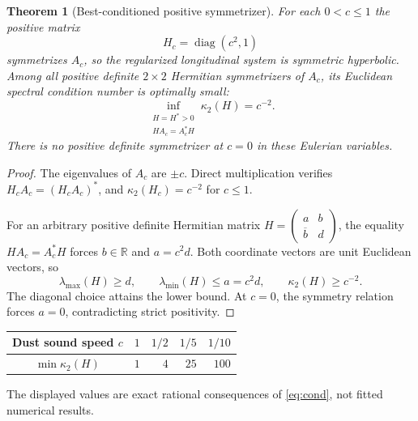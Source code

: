 \documentclass[11pt,a4paper]{article}
\newtheorem{theorem}{Theorem}
\newcommand{\R}{\mathbb R}
\begin{document}
\begin{theorem}[Best-conditioned positive symmetrizer]
\label{thm:sym}
For each $0<c\le1$ the positive
matrix
\begin{equation}\label{eq:Hc}
H_c=\operatorname{diag}(c^2,1)
\end{equation}
symmetrizes $A_c$, so the regularized
longitudinal system is symmetric hyperbolic.
Among \emph{all} positive definite
$2\times2$ Hermitian symmetrizers of
$A_c$, its Euclidean spectral condition
number is optimally small:
\begin{equation}\label{eq:cond}
\boxed{\quad
\inf_{\substack{H=H^\ast>0\\HA_c=A_c^\ast H}}
\kappa_2(H)=c^{-2}.
\quad}
\end{equation}
There is no positive definite symmetrizer
at $c=0$ in these Eulerian variables.
\end{theorem}
\begin{proof}
The eigenvalues of $A_c$ are $\pm c$.
Direct multiplication verifies
$H_cA_c=(H_cA_c)^\ast$, and
$\kappa_2(H_c)=c^{-2}$ for $c\le1$.

For an arbitrary positive definite
Hermitian matrix
$H=\left(\begin{smallmatrix}
a&b\\\overline b&d\end{smallmatrix}\right)$,
the equality $HA_c=A_c^\ast H$
forces $b\in\R$ and $a=c^2d$.
Both coordinate vectors are
unit Euclidean vectors, so
\[
\lambda_{\max}(H)\ge d,\qquad
\lambda_{\min}(H)\le a=c^2d,
\qquad\kappa_2(H)\ge c^{-2}.
\]
The diagonal choice attains the lower bound.
At $c=0$, the symmetry relation forces
$a=0$, contradicting strict positivity.
\end{proof}


\begin{center}
\begin{tabular}{c|rrrr}
\toprule
Dust sound speed $c$&$1$&$1/2$&$1/5$&$1/10$\\
\midrule
$\min\kappa_2(H)$&$1$&$4$&$25$&$100$\\
\bottomrule
\end{tabular}
\end{center}
The displayed values are exact rational consequences of
\eqref{eq:cond}, not fitted numerical results.
\end{document}
